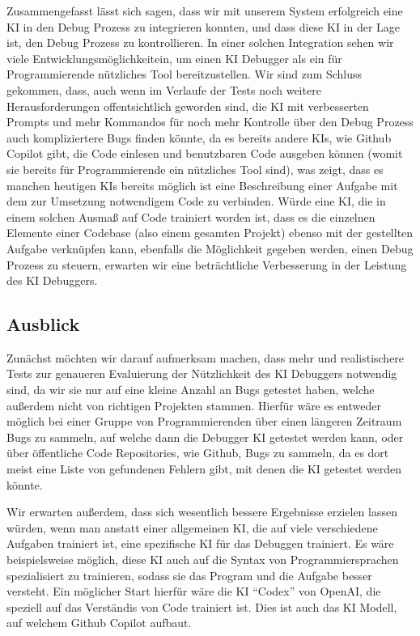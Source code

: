 \documentclass[a4paper,12pt,ngerman]{scrartcl}
\begin{document}
Zusammengefasst lässt sich sagen, dass wir mit unserem System erfolgreich eine KI in den Debug Prozess zu integrieren konnten, und dass diese KI in der Lage ist, den Debug Prozess zu kontrollieren. In einer solchen Integration sehen wir viele Entwicklungsmöglichkeitein, um einen KI Debugger als ein für Programmierende nützliches Tool bereitzustellen. Wir sind zum Schluss gekommen, dass, auch wenn im Verlaufe der Tests noch weitere Herausforderungen offentsichtlich geworden sind, die KI mit verbesserten Prompts und mehr Kommandos für noch mehr Kontrolle über den Debug Prozess auch kompliziertere Bugs finden könnte, da es bereits andere KIs, wie Github Copilot gibt, die Code einlesen und benutzbaren Code ausgeben können (womit sie bereits für Programmierende ein nützliches Tool sind), was zeigt, dass es manchen heutigen KIs bereits möglich ist eine Beschreibung einer Aufgabe mit dem zur Umsetzung notwendigem Code zu verbinden. Würde eine KI, die in einem solchen Ausmaß auf Code trainiert worden ist, dass es die einzelnen Elemente einer Codebase (also einem gesamten Projekt) ebenso mit der gestellten Aufgabe verknüpfen kann, ebenfalls die Möglichkeit gegeben werden, einen Debug Prozess zu steuern, erwarten wir eine beträchtliche Verbesserung in der Leistung des KI Debuggers.

\subsection{Ausblick}

Zunächst möchten wir darauf aufmerksam machen, dass mehr und realistischere Tests zur genaueren Evaluierung der Nützlichkeit des KI Debuggers notwendig sind, da wir sie nur auf eine kleine Anzahl an Bugs getestet haben, welche außerdem nicht von richtigen Projekten stammen. Hierfür wäre es entweder möglich bei einer Gruppe von Programmierenden über einen längeren Zeitraum Bugs zu sammeln, auf welche dann die Debugger KI getestet werden kann, oder über öffentliche Code Repositories, wie Github, Bugs zu sammeln, da es dort meist eine Liste von gefundenen Fehlern gibt, mit denen die KI getestet werden könnte.

Wir erwarten außerdem, dass sich wesentlich bessere Ergebnisse erzielen lassen würden, wenn man anstatt einer allgemeinen KI, die auf viele verschiedene Aufgaben trainiert ist, eine spezifische KI für das Debuggen trainiert. Es wäre beispielsweise möglich, diese KI auch auf die Syntax von Programmiersprachen spezialisiert zu trainieren, sodass sie das Program und die Aufgabe besser versteht. Ein möglicher Start hierfür wäre die KI ``Codex'' von OpenAI, die speziell auf das Verständis von Code trainiert ist. Dies ist auch das KI Modell, auf welchem Github Copilot aufbaut.
\end{document}

